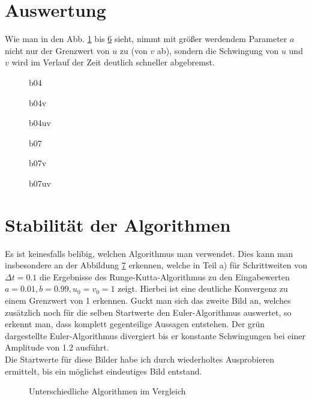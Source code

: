 \documentclass[12pt,a4paper,titlepage,headinclude,bibtotoc]{scrartcl}
\begin{document}
\section{Auswertung}
\label{sec:auswertung}
Wie man in den Abb. \ref{b04u1v1} bis \ref{b07u1v1uv} sieht, nimmt mit größer werdendem Parameter $a$ nicht nur der Grenzwert von $u$ zu (von $v$ ab), sondern die Schwingung von $u$ und $v$ wird im Verlauf der Zeit deutlich schneller abgebremst.
\begin{figure}
\centering

\caption{b04}\label{b04u1v1}
\end{figure}
\begin{figure}
\centering

\caption{b04v}\label{b04u1v1v}
\end{figure}
\begin{figure}
\centering

\caption{b04uv}\label{b04u1v1uv}
\end{figure}
\begin{figure}
\centering

\caption{b07\label{b07u1v1}}
\end{figure}
\begin{figure}
\centering

\caption{b07v\label{b07u1v1v}}
\end{figure}
\begin{figure}
\centering

\caption{b07uv}\label{b07u1v1uv}
\end{figure}


\section{Stabilität der Algorithmen}
Es ist keinesfalls belibig, welchen Algorithmus man verwendet.
Dies kann man insbesondere an der Abbildung \ref{fig:stabi} erkennen, welche in Teil a) für Schrittweiten von $\Delta t=0.1$ die Ergebnisse des Runge-Kutta-Algorithmus zu den Eingabewerten $a=0.01, b=0.99, u_0=v_0=1$ zeigt.
Hierbei ist eine  deutliche Konvergenz zu einem  Grenzwert von 1 erkennen.
Guckt man sich das zweite Bild an, welches zusätzlich noch für die selben Startwerte den Euler-Algorithmus auswertet, so erkennt man, dass komplett gegenteilige Aussagen entstehen.
Der grün dargestellte Euler-Algorithmus divergiert bis er konstante Schwingungen bei einer Amplitude von 1.2 ausführt.\\
Die Startwerte für diese Bilder habe ich durch wiederholtes Ausprobieren ermittelt, bis ein möglichst eindeutiges Bild entstand.

\begin{figure}[htb]
  \centering
   \hfill
   \caption{Unterschiedliche Algorithmen im Vergleich}
   \label{fig:stabi}
 \end{figure}
\end{document}

